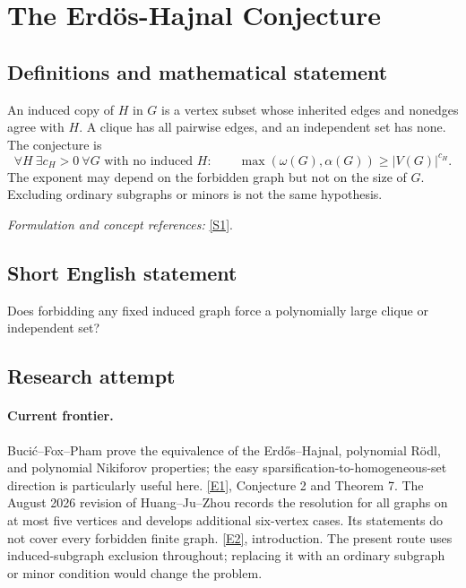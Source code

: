 \documentclass[11pt,a4paper]{article}
\newcommand{\sref}[2]{\hyperlink{source:#1:#2}{[S#2]}}
\newcommand{\eref}[2]{\hyperlink{extra:#1:#2}{[E#2]}}
\newif\ifshowcatalogue
\newcommand{\cataloguescope}[1]{\ifshowcatalogue
 \paragraph{Exact scope in the supplied catalogue.}
 \begin{quote}\small #1\end{quote}\fi}
\numberwithin{equation}{section}
\begin{document}
\setcounter{section}{0}
\clearpage
\section*{\texorpdfstring{The Erdös-Hajnal Conjecture}{The Erdös-Hajnal Conjecture}}\label{3281}
\subsection{Definitions and mathematical statement}
An induced copy of $H$ in $G$ is a vertex subset whose inherited edges and nonedges agree with $H$. A clique has all pairwise edges, and an independent set has none. The conjecture is
\[
 \forall H\ \exists c_H>0\ \forall G\text{ with no induced }H:\qquad
 \max(\omega(G),\alpha(G))\ge |V(G)|^{c_H}.
\]
The exponent may depend on the forbidden graph but not on the size of $G$. Excluding ordinary subgraphs or minors is not the same hypothesis.
\par\smallskip\textit{Formulation and concept references:} \sref{3281}{1}.
\cataloguescope{Prove that for every fixed finite graph H there is a constant c\_H>0 such that every n-vertex graph with no induced subgraph isomorphic to H contains a clique or an independent set of size at least n\textasciicircum{}\{c\_H\}.}
\subsection{Short English statement}
Does forbidding any fixed induced graph force a polynomially large clique or independent set?
\subsection{Research attempt}

\paragraph{Current frontier.}
Buci\'c--Fox--Pham prove the equivalence of the Erd\H{o}s--Hajnal,
polynomial R\"odl, and polynomial Nikiforov properties; the easy
sparsification-to-homogeneous-set direction is particularly useful here.
\eref{3281}{1}, Conjecture 2 and Theorem 7.
The August 2026 revision of Huang--Ju--Zhou records the resolution for
all graphs on at most five vertices and develops additional six-vertex
cases.  Its statements do not cover every forbidden finite graph.
\eref{3281}{2}, introduction.
The present route uses induced-subgraph exclusion throughout; replacing
it with an ordinary subgraph or minor condition would change the problem.
\end{document}
